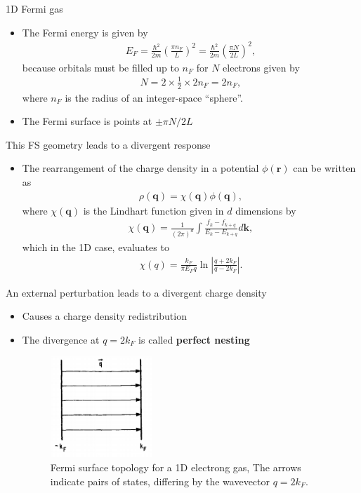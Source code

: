 \documentclass{beamer}
\newcommand*\vf[1]{\mathbf{#1}}
\begin{document}
\begin{frame}{1D Fermi gas}
\begin{itemize}
\item The Fermi energy is given by
\begin{align}
E_F = \frac{\hbar^2}{2 m}\left(\frac{\pi n_F}{L}\right)^2 = \frac{\hbar^2}{2 m}\left(\frac{\pi N}{2 L}\right)^2,
\end{align}
because orbitals must be filled up to $n_F$ for $N$ electrons given by
\begin{align}
N = 2 \times \frac{1}{2} \times 2 n_F = 2 n_F,
\end{align}
where $n_F$ is the radius of an integer-space ``sphere''.
\item The Fermi surface is points at $\pm \pi N / 2 L$
\end{itemize}
\end{frame}

\begin{frame}{This FS geometry leads to a divergent response}
\begin{itemize}
\item The rearrangement of the charge density in a potential $\phi(\vf{r})$ can be written as
\begin{align}
\rho(\vf{q}) = \chi(\vf{q}) \phi(\vf{q}),
\end{align}
where $\chi(\vf{q})$ is the Lindhart function given in $d$ dimensions by
\begin{align}
\chi(\vf{q}) = \frac{1}{(2 \pi)^d} \int \frac{f_k - f_{k + q}}{E_k - E_{k + q}} d \vf{k},
\end{align}
which in the 1D case, evaluates to
\begin{align}
\chi(q) = \frac{k_F}{\pi E_F q}\ln{\left|\frac{q + 2k_F}{q - 2k_F}\right|}.
\end{align}
\end{itemize}
\end{frame}

\begin{frame}{An external perturbation leads to a divergent charge density}
\begin{itemize}
\item Causes a charge density redistribution
\item The divergence at $q = 2 k_F$ is called \textbf{perfect nesting}
\begin{figure}
\includegraphics[width=1.5in]{figs/1d_nesting.png}
\caption{\label{fig:1d_nesting} Fermi surface topology for a 1D electrong gas, The arrows indicate pairs of states, differing by the
wavevector $q = 2 k_F$.}
\end{figure}
\end{itemize}
\end{frame}
\end{document}
